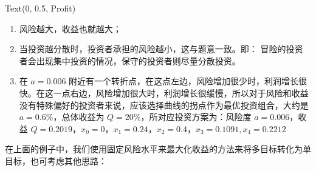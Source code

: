 \documentclass[letterpaper,10pt,english]{sphinxmanual}
\begin{document}
\begin{sphinxVerbatim}[commandchars=\\\{\}]
Text(0, 0.5, \PYGZsq{}Profit\PYGZsq{})
\end{sphinxVerbatim}

\noindent{}

\begin{enumerate}
%
\item {} 
风险越大，收益也就越大；

\item {} 
当投资越分散时，投资者承担的风险越小，这与题意一致。即：
冒险的投资者会出现集中投资的情况，保守的投资者则尽量分散投资。

\item {} 
在 \(a=0.006\) 附近有一个转折点，在这点左边，风险增加很少时，利润增长很快。在这一点右边，风险增加很大时，利润增长很缓慢，所以对于风险和收益没有特殊偏好的投资者来说，应该选择曲线的拐点作为最优投资组合，大约是 \(a=0.6\%\)，总体收益为 \(Q=20\%\)，所对应投资方案为：风险度 \(a = 0.006\)，收益 \(Q = 0.2019\)，\(x_0=0，x_1=0.24，x_2=0.4，x_3=0.1091, x_4=0.2212\)

\end{enumerate}


在上面的例子中，我们使用固定风险水平来最大化收益的方法来将多目标转化为单目标，也可考虑其他思路：
\end{document}

